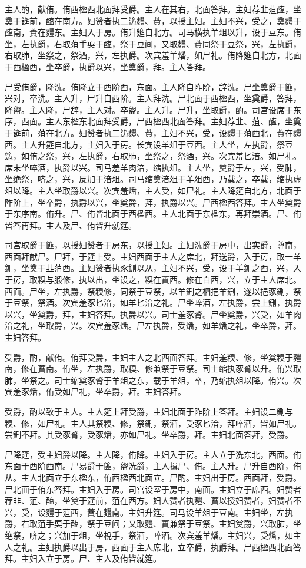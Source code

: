 \documentclass[]{article}
\begin{document}
主人酌，献侑。侑西楹西北面拜受爵。主人在其右，北面答拜。主妇荐韭菹醢，坐奠于筵前，醢在南方。妇赞者执二笾麷、蕡，以授主妇。主妇不兴，受之，奠麷于醢南，蕡在麷东。主妇入于房。侑升筵自北方。司马横执羊俎以升，设于豆东。侑坐，左执爵，右取菹手耎于醢，祭于豆间，又取麷、蕡同祭于豆祭，兴，左执爵，右取肺，坐祭之，祭酒，兴，左执爵。次宾羞羊燔，如尸礼。侑降筵自北方，北面于西楹西，坐卒爵，执爵以兴，坐奠爵，拜。主人答拜。

尸受侑爵，降洗。侑降立于西阶西，东面。主人降自阼阶，辞洗。尸坐奠爵于篚，兴对，卒洗。主人升，尸升自西阶。主人拜洗。尸北面于西楹西，坐奠爵，答拜，降盥。主人降，尸辞，主人对。卒盥。主人升。尸升，坐取爵，酌。司宫设席于东序，西面。主人东楹东北面拜受爵，尸西楹西北面答拜。主妇荐韭、菹、醢，坐奠于筵前，菹在北方。妇赞者执二笾麷、蕡，主妇不兴，受，设麷于菹西北，蕡在麷西。主人升筵自北方，主妇入于房。长宾设羊俎于豆西。主人坐，左执爵，祭豆笾，如侑之祭，兴，左执爵，右取肺，坐祭之，祭酒，兴。次宾羞匕湆。如尸礼。席末坐啐酒，执爵以兴。司马羞羊肉湆，缩执俎。主人坐，奠爵于左，兴，受肺，坐绝祭，哜之，兴，反加于湆俎。司马缩奠湆俎于羊俎西，乃载之，卒载，缩执虚俎以降。主人坐取爵以兴。次宾羞燔，主人受，如尸礼。主人降筵自北方，北面于阼阶上，坐卒爵，执爵以兴，坐奠爵，拜，执爵以兴。尸西楹西答拜。主人坐奠爵于东序南。侑升。尸、侑皆北面于西楹西。主人北面于东楹东，再拜崇酒。尸、侑皆答再拜。主人及尸、侑皆升就筵。

司宫取爵于篚，以授妇赞者于房东，以授主妇。主妇洗爵于房中，出实爵，尊南，西面拜献尸。尸拜，于筵上受。主妇西面于主人之席北，拜送爵，入于房，取一羊鉶，坐奠于韭菹西。主妇赞者执豕鉶以从，主妇不兴，受，设于羊鉶之西，兴，入于房，取糗与腶修，执以出，坐设之，糗在蕡西。修在白西，兴，立于主人席北。西面。尸坐，左执爵，祭糗修，同祭于豆祭，以羊鉶之柶挹羊鉶，遂以挹豕鉶，祭于豆祭，祭酒。次宾羞豕匕湆，如羊匕湆之礼。尸坐啐酒，左执爵，尝上鉶，执爵以兴，坐奠爵，拜，主妇答拜。执爵以兴。司士羞豕脀。尸坐奠爵，兴受，如羊肉湆之礼，坐取爵，兴。次宾羞豕燔。尸左执爵，受燔，如羊燔之礼，坐卒爵，拜。主妇答拜。

受爵，酌，献侑。侑拜受爵，主妇主人之北西面答拜。主妇羞糗、修，坐奠糗于麷南，修在蕡南。侑坐，左执爵，取糗、修兼祭于豆祭。司士缩执豕脀以升。侑兴取肺，坐祭之。司士缩奠豕脀于羊俎之东，载于羊俎，卒，乃缩执俎以降。侑兴。次宾羞豕燔，侑受如尸礼，坐卒爵，拜。主妇答拜。

受爵，酌以致于主人。主人筵上拜受爵，主妇北面于阼阶上答拜。主妇设二鉶与糗、修，如尸礼。主人其祭糗、修，祭鉶，祭酒，受豕匕湆，拜啐酒，皆如尸礼。尝鉶不拜。其受豕脀，受豕燔，亦如尸礼。坐卒爵，拜。主妇北面答拜，受爵。

尸降筵，受主妇爵以降。主人降，侑降。主妇入于房。主人立于洗东北，西面。侑东面于西阶西南。尸易爵于篚，盥洗爵，主人揖尸、侑。主人升。尸升自西阶，侑从。主人北面立于东楹东，侑西楹西北面立。尸酌。主妇出于房。西面拜，受爵。尸北面于侑东答拜。主妇入于房。司宫设室于房中，南面。主妇立于席西。妇赞者荐韭、菹、醢，坐奠于筵前，菹在西方。妇人赞者执麷、蕡以授妇赞者，妇赞者不兴，受，设麷于菹西，蕡在麷南。主妇升筵。司马设羊俎于豆南。主妇坐，左执爵，右取菹手耎于醢，祭于豆间；又取麷、蕡兼祭于豆祭。主妇奠爵，兴取肺，坐绝祭，哜之；兴加于俎，坐梲手，祭酒，啐酒。次宾羞羊燔。主妇兴，受燔，如主人之礼。主妇执爵以出于房，西面于主人席北，立卒爵，执爵拜。尸西楹西北面答拜。主妇入立于房。尸、主人及侑皆就筵。
\end{document}
